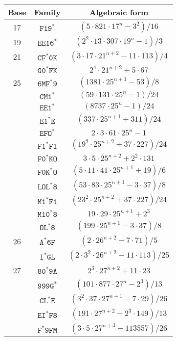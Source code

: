 \documentclass[12pt]{article}
\theoremstyle{plain}
\theoremstyle{definition}
\newcommand{\0}{\mathtt{0}}
\newcommand{\1}{\mathtt{1}}
\newcommand{\2}{\mathtt{2}}
\newcommand{\3}{\mathtt{3}}
\newcommand{\4}{\mathtt{4}}
\newcommand{\5}{\mathtt{5}}
\newcommand{\6}{\mathtt{6}}
\newcommand{\7}{\mathtt{7}}
\newcommand{\8}{\mathtt{8}}
\newcommand{\9}{\mathtt{9}}
\newcommand{\updated}[1]{{\color{red}#1}}
\renewcommand{\updated}[1]{#1}
\begin{document}
\begin{figure}%
\updated{\begin{center}\begin{tabular}{ccc}
Base & Family & Algebraic form \\ \hline
17 & $\mathtt{F19^*}$ & $(5\cdot821\cdot17^n-3^2)/16$ \\
19 & $\mathtt{EE16^*}$ & $(2^2\cdot13\cdot307\cdot19^n-1)/3$ \\
21 & $\mathtt{CF^*0K}$ & $(3\cdot17\cdot21^{n+2}-11\cdot113)/4$ \\
& $\mathtt{G0^*FK}$ & $2^4\cdot21^{n+2}+5\cdot67$ \\
25 & $\mathtt{6MF^*9}$ & $(1381\cdot25^{n+1}-53)/8$ \\
& $\mathtt{CM1^*}$ & $(59\cdot131\cdot25^n-1)/24$ \\
& $\mathtt{EE1^*}$ & $(8737\cdot25^n-1)/24$ \\
& $\mathtt{E1^*E}$ & $(337\cdot25^{n+1}+311)/24$ \\
& $\mathtt{EFO^*}$ & $2\cdot3\cdot61\cdot25^n-1$ \\
& $\mathtt{F1^*F1}$ & $(19^2\cdot25^{n+2}+37\cdot227)/24$ \\
& $\mathtt{F0^*KO}$ & $3\cdot5\cdot25^{n+2}+2^2\cdot131$ \\
& $\mathtt{F0K^*O}$ & $(5\cdot11\cdot41\cdot25^{n+1}+19)/6$ \\
& $\mathtt{LOL^*8}$ & $(53\cdot83\cdot25^{n+1}-3\cdot37)/8$ \\
& $\mathtt{M1^*F1}$ & $(23^2\cdot25^{n+2}+37\cdot227)/24$ \\
& $\mathtt{M10^*8}$ & $19\cdot29\cdot25^{n+1}+2^3$ \\
& $\mathtt{OL^*8}$ & $(199\cdot25^{n+1}-3\cdot37)/8$ \\
26 & $\mathtt{A^*6F}$ & $(2\cdot26^{n+2}-7\cdot71)/5$ \\
& $\mathtt{I^*GL}$ & $(2\cdot3^2\cdot26^{n+2}-11\cdot113)/25$ \\
27 & $\mathtt{80^*9A}$ & $2^3\cdot27^{n+2}+11\cdot23$ \\
& $\mathtt{999G^*}$ & $(101\cdot877\cdot27^n-2^3)/13$ \\
& $\mathtt{CL^*E}$ & $(3^2\cdot37\cdot27^{n+1}-7\cdot29)/26$ \\
& $\mathtt{EI^*F8}$ & $(191\cdot27^{n+2}-2^3\cdot149)/13$ \\
& $\mathtt{F^*9FM}$ & $(3\cdot5\cdot27^{n+3}-113557)/26$ \\

\end{tabular}
\end{center}}
\end{figure}
\end{document}
